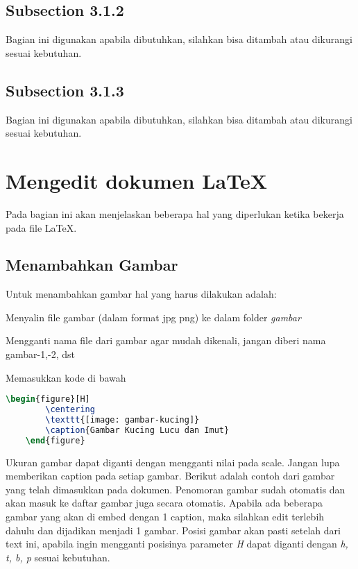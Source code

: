 \subsection{Subsection 3.1.2}
Bagian ini digunakan apabila dibutuhkan, silahkan bisa ditambah atau dikurangi sesuai kebutuhan.

\subsection{Subsection 3.1.3}
Bagian ini digunakan apabila dibutuhkan, silahkan bisa ditambah atau dikurangi sesuai kebutuhan.

\section{Mengedit dokumen \LaTeX}
Pada bagian ini akan menjelaskan beberapa hal yang diperlukan ketika bekerja pada file \LaTeX.

\subsection{Menambahkan Gambar}
Untuk menambahkan gambar hal yang harus dilakukan adalah:
\begin{packed_enum}
    \item Menyalin file gambar (dalam format jpg \/ png) ke dalam folder \textit{gambar}
    \item Mengganti nama file dari gambar agar mudah dikenali, jangan diberi nama gambar-1,-2, dst
    \item Memasukkan kode di bawah
\end{packed_enum}

\begin{lstlisting}[language=TeX]
    \begin{figure}[H]
        \centering
        \texttt{[image: gambar-kucing]}
        \caption{Gambar Kucing Lucu dan Imut}
    \end{figure}
\end{lstlisting}

Ukuran gambar dapat diganti dengan mengganti nilai pada scale. Jangan lupa memberikan caption pada setiap gambar. Berikut adalah contoh dari gambar yang telah dimasukkan pada dokumen. Penomoran gambar sudah otomatis dan akan masuk ke daftar gambar juga secara otomatis. Apabila ada beberapa gambar yang akan di embed dengan 1 caption, maka silahkan edit terlebih dahulu dan dijadikan menjadi 1 gambar. Posisi gambar akan pasti setelah dari text ini, apabila ingin mengganti posisinya parameter \textit{H} dapat diganti dengan \textit{h, t, b, p} sesuai kebutuhan.

